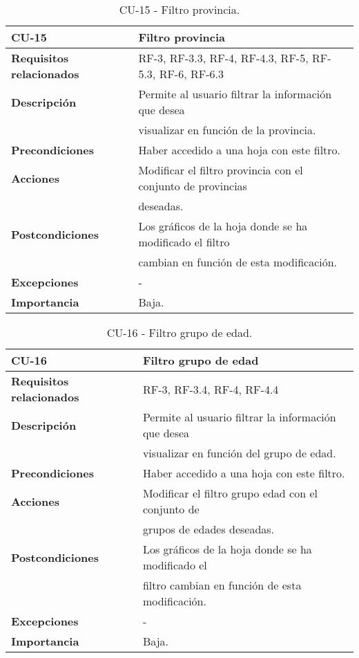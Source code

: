 \begin{table}[ht!]
    \centering
    \resizebox{15cm}{!} {
    \begin{tabular}{|l|l|}
    \hline
         \textbf{CU-15}     &  \textbf{Filtro provincia} \\ \hline
         \textbf{Requisitos relacionados}       & RF-3, RF-3.3, RF-4, RF-4.3, RF-5, RF-5.3, RF-6, RF-6.3  \\ \hline
         \textbf{Descripción}    & Permite al usuario filtrar la información que desea \\&visualizar en función de la provincia. \\ \hline   
         \textbf{Precondiciones}      &  Haber accedido a una hoja con este filtro. \\ \hline
         \textbf{Acciones}      & Modificar el filtro provincia con el conjunto de provincias\\& deseadas. \\ \hline
         \textbf{Postcondiciones}       & Los gráficos de la hoja donde se ha modificado el filtro \\&cambian en función de esta modificación. \\ \hline
         \textbf{Excepciones}       & -  \\ \hline
         \textbf{Importancia}   & Baja. \\
         \hline
    \end{tabular}}
    \caption{CU-15 - Filtro provincia.}
    \label{tab:my_label}
\end{table}

\begin{table}[ht!]
    \centering
    \resizebox{15cm}{!} {
    \begin{tabular}{|l|l|}
    \hline
         \textbf{CU-16}     &  \textbf{Filtro grupo de edad} \\ \hline
         \textbf{Requisitos relacionados}       & RF-3, RF-3.4, RF-4, RF-4.4  \\ \hline
         \textbf{Descripción}    & Permite al usuario filtrar la información que desea \\&visualizar en función del grupo de edad. \\ \hline   
         \textbf{Precondiciones}      & Haber accedido a una hoja con este filtro. \\ \hline
         \textbf{Acciones}      & Modificar el filtro grupo edad con el conjunto de\\& grupos de edades deseadas. \\ \hline
         \textbf{Postcondiciones}       & Los gráficos de la hoja donde se ha modificado el \\&filtro cambian en función de esta modificación. \\ \hline
         \textbf{Excepciones}       & - \\ \hline
         \textbf{Importancia}   &Baja. \\
         \hline
    \end{tabular}}
    \caption{CU-16 - Filtro grupo de edad.}
    \label{tab:my_label}
\end{table}

